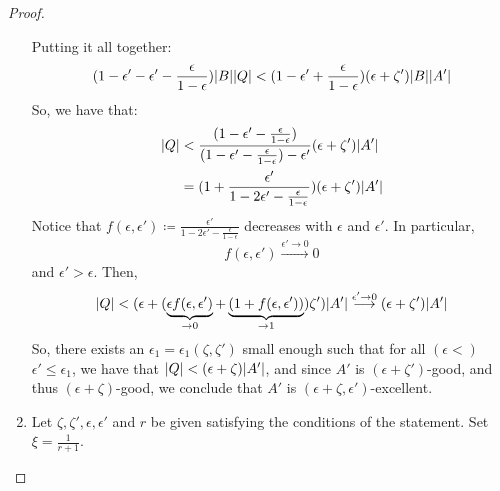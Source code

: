 \begin{lemma}[Claim 5.13]
\begin{proof}
\begin{enumerate}[label=(\alph*), ref=\alph*]
                    Putting it all together:
                    \[
                        ( 1 - \epsilon' - \epsilon' - \frac{\epsilon}{1 - \epsilon} ) | B | | Q | <
                        ( 1 - \epsilon' + \frac{\epsilon}{1 - \epsilon} ) ( \epsilon + \zeta' ) | B | | A' |
                    \]
                    So, we have that:
                    \begin{align*}
                        | Q | & < \frac{( 1 - \epsilon' - \frac{\epsilon}{1 - \epsilon} )}
                                            {( 1 - \epsilon' - \frac{\epsilon}{1 - \epsilon} ) - \epsilon'}
                                            ( \epsilon + \zeta' ) | A' | \\
                                        & = ( 1 + \frac{\epsilon'}{1 - 2\epsilon' - \frac{\epsilon}{1 - \epsilon}} )
                                            (\epsilon + \zeta') |A'|
                    \end{align*}
                    Notice that $f(\epsilon, \epsilon') \coloneqq \frac{\epsilon'}{1 - 2\epsilon' - \frac{\epsilon}{1 - \epsilon}}$
                    decreases with $\epsilon$ and $\epsilon'$.
                    In particular,
                    \[
                        f(\epsilon, \epsilon') \overset{\epsilon' \to 0}{\longrightarrow} 0
                    \]
                    and $\epsilon' > \epsilon$.
                    Then,
                    \[
                        | Q | < ( \epsilon + ( \underbrace{\epsilon f(\epsilon, \epsilon')}_{\to 0} +
                        \underbrace{( 1 + f(\epsilon, \epsilon') )}_{\to 1} ) \zeta' ) |A'|
                        \overset{\epsilon' \to 0}{\longrightarrow} ( \epsilon + \zeta' ) |A'|
                    \]
                    So, there exists an $\epsilon_1 = \epsilon_1(\zeta, \zeta')$ small enough such that for all
                    $(\epsilon <)$ $\epsilon' \leq \epsilon_1$, we have that $| Q | < ( \epsilon + \zeta ) |A'|$,
                    and since $A'$ is $(\epsilon + \zeta')$-good, and thus $(\epsilon + \zeta)$-good, we conclude that
                    $A'$ is $(\epsilon + \zeta, \epsilon')$-excellent. 
                \item Let $\zeta, \zeta', \epsilon, \epsilon'$ and $r$ be given satisfying the conditions of the statement.
                    Set $\xi = \frac{1}{r + 1}$.

\end{enumerate}
\end{proof}
\end{lemma}
